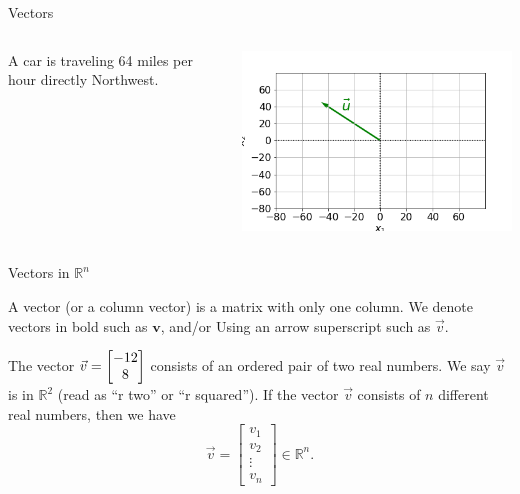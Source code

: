 \documentclass[xcolor=dvipsnames,aspectratio=169,t]{beamer}
\begin{document}
\begin{frame}{Vectors}
\begin{columns}[T]
    
    \column{0.33\tw}

    A car is traveling 64 miles per hour directly Northwest.

\includegraphics[width=0.95\tw]{images/fig-northwest.png}


\end{columns}
    
\end{frame}

\begin{frame}{Vectors in $\mathbb{R}^n$}

  \bbox
  A \alert{vector} (or a \alert{column vector}) is a matrix with only one column.
  \bi
    \ii We denote vectors in bold such as $\mathbf{v}$, and/or
    \ii Using an arrow superscript such as $\vec{v}$.
  \ei
  \ebox

\vfill
  
  \pause
  \bi
  \ii The vector $\displaystyle \vec{v} = \begin{bmatrix} -12 \\ 8 \end{bmatrix}$ consists of an ordered pair of two real numbers. We say $\vec{v}$ is in $\mathbb{R}^2$ (read as ``r two'' or ``r squared'').
  \ii If the vector $\vec{v}$ consists of $n$ different real numbers, then we have
  \[ \vec{v} = \begin{bmatrix} v_1 \\ v_2 \\ \vdots \\ v_n \end{bmatrix} \in \mathbb{R}^n.\]
  \ei

\end{frame}
  
\end{document}
